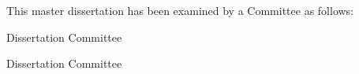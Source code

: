 \begin{titlepage}
\begin{large}
This master dissertation has been examined by a Committee as follows:

\signature{Alex Sandro Gomes}{Dissertation Committee \\
  \ufpe}

\signature{João Marcelo Natário Texeira}{Dissertation Committee \\
   \ufrpe}


\end{large}
\end{titlepage}


